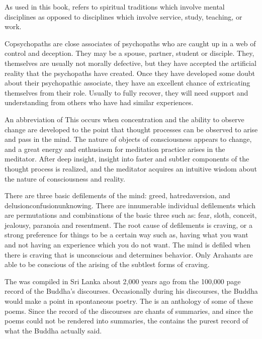 \documentclass[a5paper,10pt,english]{book}
\begin{document}
\begin{description}
\sphinxAtStartPar
As used in this book,  refers to
spiritual traditions which involve mental disciplines as opposed to
disciplines which involve service, study, teaching, or work.

\sphinxAtStartPar
Co\sphinxhyphen{}psychopaths are close associates of psychopaths who
are caught up in a web of control and deception. They may be a spouse,
partner, student or disciple. They, themselves are usually not morally
defective, but they have accepted the artificial reality that the
psychopaths have created. Once they have developed some doubt about
their psychopathic associate, they have an excellent chance of
extricating themselves from their role. Usually to fully recover, they
will need support and understanding from others who have had similar
experiences.

\sphinxAtStartPar
An abbreviation of  This occurs when concentration and the ability to
observe change are developed to the point that thought processes can be
observed to arise and pass in the mind. The nature of objects of
consciousness appears to change, and a great energy and enthusiasm for
meditation practice arises in the meditator. After deep insight, insight
into faster and subtler components of the thought process is realized,
and the meditator acquires an intuitive wisdom about the nature of
consciousness and reality.

\sphinxAtStartPar
There are three basic defilements of the mind:
greed, hatred\sphinxhyphen{}aversion, and delusion\sphinxhyphen{}confusion\sphinxhyphen{}unknowing. There are
innumerable individual defilements which are permutations and
combinations of the basic three such as: fear, sloth, conceit, jealousy,
paranoia and resentment. The root cause of defilements is craving, or a
strong preference for things to be a certain way such as, having what
you want and not having an experience which you do not want. The mind is
defiled when there is craving that is unconscious and determines
behavior. Only Arahants are able to be conscious of the arising of the
subtlest forms of craving.

\sphinxAtStartPar
The  was compiled in Sri Lanka about 2,000
years ago from the 100,000 page record of the Buddha’s discourses.
Occasionally during his discourses, the Buddha would make a point in
spontaneous poetry. The  is an anthology of some of these
poems. Since the record of the discourses are chants of summaries, and
since the poems could not be rendered into summaries, the 
contains the purest record of what the Buddha actually said.


\end{description}
\end{document}
